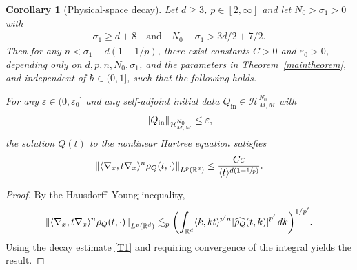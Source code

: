 \documentclass[10pt,a4paper]{article}
\theoremstyle{plain}
\newtheorem{corollary}[theorem]{Corollary}
\theoremstyle{remark}
\newcommand{\bbbr}[1]{\biggl(#1 \biggr)}
\newcommand{\jb}[1]{\langle#1\rangle}
\newcommand{\qaq}{\quad\text{and}\quad}
\newcommand{\ep}{\varepsilon}
\newcommand{\R}{\mathbb{R}}
\newcommand{\Qin}{Q_{\mathrm{in}}}
\begin{document}
\begin{corollary}[Physical-space decay]
Let $d\geq 3$, $p\in[2,\infty]$ and let $N_0>\sigma_1>0$ with
\begin{align*}
\sigma_1\geq d+8\qaq N_0-\sigma_1>3d/2+7/2.
\end{align*}
Then for any $n<\sigma_1-d(1-1/p)$, there exist constants $C>0$ and $\ep_0>0$, depending only on $d,p,n,N_0,\sigma_1$, and the parameters in Theorem~\ref{maintheorem}, and independent of $\hbar\in(0,1]$, such that the following holds.

For any $\ep\in(0,\ep_0]$ and any self-adjoint initial data $\Qin\in\mathcal{H}^{N_0}_{M,M}$ with
\begin{align*}
\norm{Q_{\mathrm{in}}}_{\mathcal H^{N_0}_{M,M}}\leq\ep,
\end{align*}
the solution $Q(t)$ to the nonlinear Hartree equation satisfies
\begin{align}\label{physicalspacedecay}
\norm{\jb{\nabla_x,t\nabla_x}^n\rho_Q(t,\cdot)}_{L^p(\R^d)}\leq \frac{C\ep}{\jb{ t}^{d(1-\sfrac{1}{p})}}.
\end{align}
\end{corollary}

\begin{proof}
By the Hausdorff--Young inequality,
\begin{align*}
\norm{\jb{\nabla_x,t\nabla_x}^n\rho_Q(t,\cdot)}_{L^p(\R^d)}
\lesssim_p \bbbr{\int_{\R^d} \jb{k,kt}^{p'n} \abs{\widehat{\rho_Q}(t,k)}^{p'} \,dk}^{1/p'}.
\end{align*}
Using the decay estimate \eqref{T1} and requiring convergence of the integral yields the result.
\end{proof}
\end{document}
